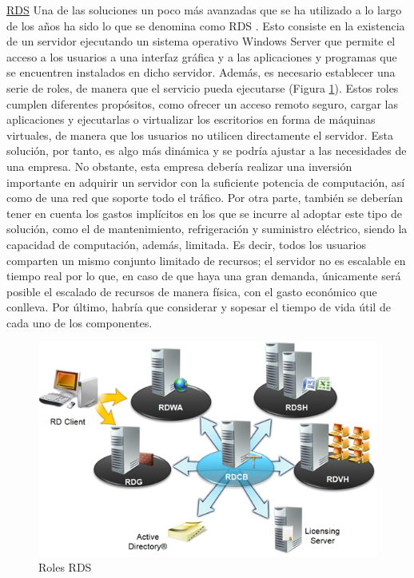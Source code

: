 \noindent\underline{\acf{RDS}}\newline
\indent Una de las soluciones un poco más avanzadas que se ha utilizado a lo largo de los años ha sido lo que se denomina como \acs{RDS} \cite{alejandroherreiz2017}. Esto consiste en la existencia de un servidor ejecutando un sistema operativo Windows Server que permite el acceso a los usuarios a una interfaz gráfica y a las aplicaciones y programas que se encuentren instalados en dicho servidor. Además, es necesario establecer una serie de roles, de manera que el servicio pueda ejecutarse (Figura \ref{fig:roles_rds}). Estos roles cumplen diferentes propósitos, como ofrecer un acceso remoto seguro, cargar las aplicaciones y ejecutarlas o virtualizar los escritorios en forma de máquinas virtuales, de manera que los usuarios no utilicen directamente el servidor. Esta solución, por tanto, es algo más dinámica y se podría ajustar a las necesidades de una empresa. No obstante, esta empresa debería realizar una inversión importante en adquirir un servidor con la suficiente potencia de computación, así como de una red que soporte todo el tráfico. Por otra parte, también se deberían tener en cuenta los gastos implícitos en los que se incurre al adoptar este tipo de solución, como el de mantenimiento, refrigeración y suministro eléctrico, siendo la capacidad de computación, además, limitada. Es decir, todos los usuarios comparten un mismo conjunto limitado de recursos; el servidor no es escalable en tiempo real por lo que, en caso de que haya una gran demanda, únicamente será posible el escalado de recursos de manera física, con el gasto económico que conlleva. Por último, habría que considerar y sopesar el tiempo de vida útil de cada uno de los componentes.

\begin{figure}[h]
    \centering
    \includegraphics[width=0.6\linewidth]{figures/images/RDS_roles.png}
    \caption{Roles \acs{RDS}}
    \label{fig:roles_rds}
\end{figure}

